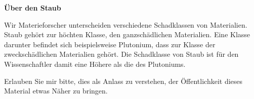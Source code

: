 \thispagestyle{empty}
\begin{center}
\end{center}
\vskip 2cm
{\Large\color{farbe}\hfill{\merriweathersans \textbf{Über den Staub}}}
\newpage
\lettrine[lines=2, lhang=.2, loversize=.25, lraise=0.05, findent=0.1em,
nindent=0em]{W}{}ir Materieforscher unterscheiden verschiedene Schadklassen von Materialien. Staub gehört zur höchten Klasse, den ganzschädlichen Materialien. Eine Klasse darunter befindet sich beispielsweise Plutonium, dass zur Klasse der zweckschädlichen Materialien gehört. Die Schadklasse von Staub ist für den Wissenschaftler damit eine Höhere als die des Plutoniums.  

Erlauben Sie mir bitte, dies als Anlass zu verstehen, der Öffentlichkeit dieses Material etwas Näher zu bringen. 


